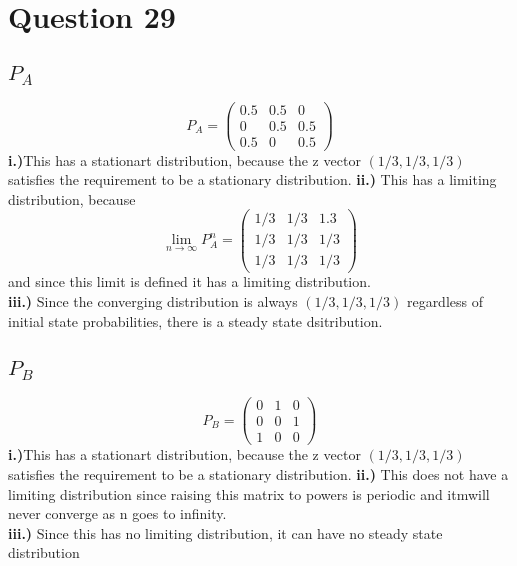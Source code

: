 \documentclass{article}
\begin{document}
\section*{Question 29}
\subsection*{\underline{$P_A$}}
\[P_A =\left(\begin{array}{rrr}
0.5&0.5&0\\
0&0.5&0.5\\
0.5&0&0.5
\end{array}\right)\]
\textbf{i.)}This has a stationart distribution, because the z vector
$(1/3,1/3,1/3)$ satisfies the requirement to be a stationary distribution. 
\newline
\textbf{ii.)} This has a limiting distribution, because 
\[\lim_{n\rightarrow\infty}{P_A^{n} }= \left(\begin{array}{rrr}
1/3&1/3&1.3\\
1/3&1/3&1/3\\
1/3&1/3&1/3
\end{array}\right)\]
and since this limit is defined it has a limiting distribution. 
\\\textbf{iii.)} Since the converging distribution is always $(1/3,1/3,1/3)$
regardless of initial state probabilities, there is a steady state dsitribution.

\subsection*{\underline{$P_B$}}
\[P_B =\left(\begin{array}{rrr} 0&1&0\\
0&0&1\\
1&0&0
\end{array}\right)\]
\textbf{i.)}This has a stationart distribution, because the z vector
$(1/3,1/3,1/3)$ satisfies the requirement to be a stationary distribution.
\newline
\textbf{ii.)} This does not have a limiting distribution since raising this
matrix to powers is periodic and itmwill never converge as n goes to infinity. 
\\\textbf{iii.)} Since this has no limiting distribution, it can have no steady
state distribution
\end{document}
